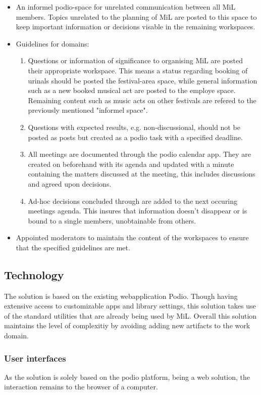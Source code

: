 \begin{itemize}
    \item An informel podio-space for unrelated communication between all MiL members. Topics unrelated to the planning of MiL are posted to this space to keep important information or decisions visable in the remaining workspaces.
    \item Guidelines for domains:
    \begin{enumerate}
        \item Questions or information of significance to organising MiL are posted their appropriate workspace. This means a status regarding booking of urinals should be posted the festival-area space, while general information such as a new booked musical act are posted to the employe space. Remaining content such as music acts on other festivals are refered to the previously mentioned "informel space".
        \item Questions with expected results, e.g. non-discussional, should not be posted as posts but created as a podio task with a specified deadline. 
        \item All meetings are documented through the podio calendar app. They are created on beforehand with its agenda and updated with a minute containing the matters discussed at the meeting, this includes discussions and agreed upon decisions.
        \item Ad-hoc decisions concluded through are added to the next occuring meetings agenda. This insures that information doesn't disappear or is bound to a single members, unobtainable from others.
    \end{enumerate}
    \item Appointed moderators to maintain the content of the workspaces to ensure that the specified guidelines are met.
\end{itemize}

\subsection{Technology}
The solution is based on the existing webapplication Podio. Though having extensive access to customizable apps and library settings, this solution takes use of the standard utilities that are already being used by MiL. Overall this solution maintains the level of complexitiy by avoiding adding new artifacts to the work domain.

\subsubsection{User interfaces}
As the solution is solely based on the podio platform, being a web solution, the interaction remains to the browser of a computer.

